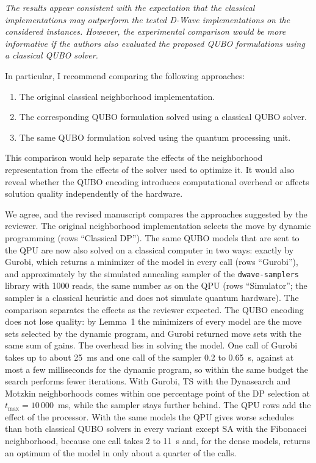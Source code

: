 \documentclass[12pt]{article}
\newenvironment{rc}[1]{\par\medskip\noindent\itshape\renewcommand{\emph}[1]{\textbf{##1}}\ignorespaces}{\par}
\newcommand{\answer}[1]{\par\smallskip\noindent #1\par}
\begin{document}
\begin{rc}{R2 5 --- Classical QUBO solver as a third variant}
The results appear consistent with the expectation that the classical implementations may outperform the tested D-Wave implementations on the considered instances. However, the experimental comparison would be more informative if the authors also evaluated the proposed QUBO formulations using a classical QUBO solver.

In particular, I recommend comparing the following approaches:
\begin{enumerate}
\item The original classical neighborhood implementation.
\item The corresponding QUBO formulation solved using a classical QUBO solver.
\item The same QUBO formulation solved using the quantum processing unit.
\end{enumerate}
This comparison would help separate the effects of the neighborhood representation from the effects of the solver used to optimize it. It would also reveal whether the QUBO encoding introduces computational overhead or affects solution quality independently of the hardware.
\end{rc}
\answer{We agree, and the revised manuscript compares the approaches suggested by the reviewer. The original neighborhood implementation selects the move by dynamic programming (rows ``Classical DP''). The same QUBO models that are sent to the QPU are now also solved on a classical computer in two ways: exactly by Gurobi, which returns a minimizer of the model in every call (rows ``Gurobi''), and approximately by the simulated annealing sampler of the \texttt{dwave-samplers} library with 1000 reads, the same number as on the QPU (rows ``Simulator''; the sampler is a classical heuristic and does not simulate quantum hardware). The comparison separates the effects as the reviewer expected. The QUBO encoding does not lose quality: by Lemma~1 the minimizers of every model are the move sets selected by the dynamic program, and Gurobi returned move sets with the same sum of gains. The overhead lies in solving the model. One call of Gurobi takes up to about 25~ms and one call of the sampler 0.2 to 0.65~s, against at most a few milliseconds for the dynamic program, so within the same budget the search performs fewer iterations. With Gurobi, TS with the Dynasearch and Motzkin neighborhoods comes within one percentage point of the DP selection at $t_{\max}=10\,000$~ms, while the sampler stays further behind. The QPU rows add the effect of the processor. With the same models the QPU gives worse schedules than both classical QUBO solvers in every variant except SA with the Fibonacci neighborhood, because one call takes 2 to 11~s and, for the dense models, returns an optimum of the model in only about a quarter of the calls.}
\end{document}
